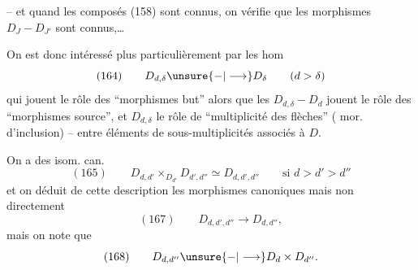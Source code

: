 -- et quand les composés (158) sont connus, on vérifie que les morphismes $D_J-D_{J'}$ sont connus,\ldots

On est donc intéressé plus particulièrement par les hom
\[
(164)\qquad D_{d,\delta}\unsure{-|\longrightarrow}D_\delta\qquad(d>\delta)
\]
qui jouent le rôle des ``morphismes but'' alors que les $D_{d,\delta}-D_d$ jouent le rôle des ``morphismes source'', et $D_{d,\delta}$ le rôle de ``multiplicité des flèches'' ( mor. d'inclusion) -- entre éléments de sous-multiplicités  associés à $D$.

On a des isom. can.
\[
(165)\qquad D_{d,d'}\times_{D_{d'}}D_{d',d''}\simeq D_{d,d',d''}\qquad\text{si }d>d'>d''
\]
et on  déduit de cette description les morphismes canoniques
mais non directement 
\[
(167)\qquad D_{d,d',d''}\longrightarrow D_{d,d''},
\]
mais on note que
\[
(168)\qquad D_{d,d''}\unsure{-|\longrightarrow}D_d\times D_{d''}.
\]

